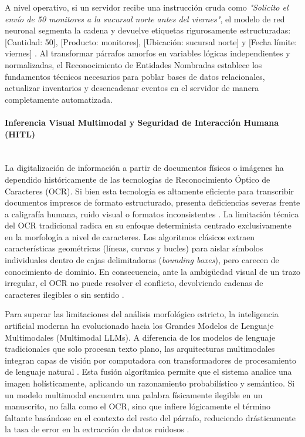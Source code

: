 A nivel operativo, si un servidor recibe una instrucción cruda como \textit{"Solicito el envío de 50 monitores a la sucursal norte antes del viernes"}, el modelo de red neuronal segmenta la cadena y devuelve etiquetas rigurosamente estructuradas: [Cantidad: 50], [Producto: monitores], [Ubicación: sucursal norte] y [Fecha límite: viernes] \cite{li_ner_deep_2020}. Al transformar párrafos amorfos en variables lógicas independientes y normalizadas, el Reconocimiento de Entidades Nombradas establece los fundamentos técnicos necesarios para poblar bases de datos relacionales, actualizar inventarios y desencadenar eventos en el servidor de manera completamente automatizada.

\paragraph{Inferencia Visual Multimodal y Seguridad de Interacción Humana (HITL)} \leavevmode \\

La digitalización de información a partir de documentos físicos o imágenes ha dependido históricamente de las tecnologías de Reconocimiento Óptico de Caracteres (OCR). Si bien esta tecnología es altamente eficiente para transcribir documentos impresos de formato estructurado, presenta deficiencias severas frente a caligrafía humana, ruido visual o formatos inconsistentes \cite{mori_ocr_1992}. La limitación técnica del OCR tradicional radica en su enfoque determinista centrado exclusivamente en la morfología a nivel de caracteres. Los algoritmos clásicos extraen características geométricas (líneas, curvas y bucles) para aislar símbolos individuales dentro de cajas delimitadoras (\textit{bounding boxes}), pero carecen de conocimiento de dominio. En consecuencia, ante la ambigüedad visual de un trazo irregular, el OCR no puede resolver el conflicto, devolviendo cadenas de caracteres ilegibles o sin sentido \cite{smith_tesseract_2007}.

Para superar las limitaciones del análisis morfológico estricto, la inteligencia artificial moderna ha evolucionado hacia los Grandes Modelos de Lenguaje Multimodales (Multimodal LLMs). A diferencia de los modelos de lenguaje tradicionales que solo procesan texto plano, las arquitecturas multimodales integran capas de visión por computadora con transformadores de procesamiento de lenguaje natural \cite{yin_multimodal_2024}. Esta fusión algorítmica permite que el sistema analice una imagen holísticamente, aplicando un razonamiento probabilístico y semántico. Si un modelo multimodal encuentra una palabra físicamente ilegible en un manuscrito, no falla como el OCR, sino que infiere lógicamente el término faltante basándose en el contexto del resto del párrafo, reduciendo drásticamente la tasa de error en la extracción de datos ruidosos \cite{yin_multimodal_2024}.

